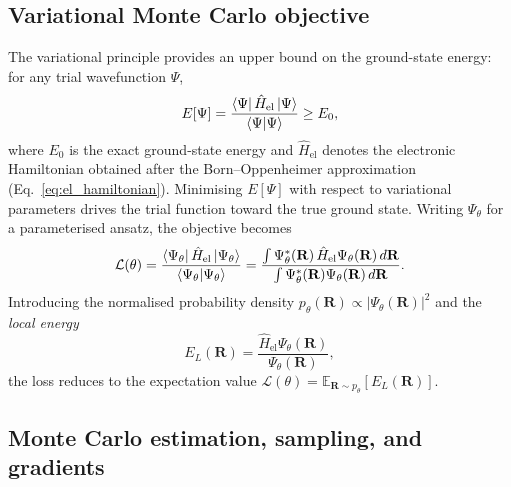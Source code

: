\subsection{Variational Monte Carlo objective}

The variational principle provides an upper bound on the ground-state energy: for any trial wavefunction $\Psi$,
\begin{equation}
	E[\Psi] = \frac{\left\langle{\Psi}\right| \hat{H}_{\text{el}}\left|{\Psi}\right\rangle}{\left\langle{\Psi}\middle|{\Psi}\right\rangle} \ge E_0,
\end{equation}
where $E_0$ is the exact ground-state energy and $\hat{H}_{\text{el}}$ denotes the electronic Hamiltonian obtained after the Born--Oppenheimer approximation (Eq.~\ref{eq:el_hamiltonian}). Minimising $E[\Psi]$ with respect to variational parameters drives the trial function toward the true ground state. Writing $\Psi_\theta$ for a parameterised ansatz, the objective becomes
\begin{equation}
	\mathcal{L}(\theta)
	=\frac{\left\langle{\Psi_{\theta}}\right| \hat{H}_{\text{el}}\left|{\Psi_{\theta}}\right\rangle}{\left\langle{\Psi_{\theta}}\middle|{\Psi_{\theta}}\right\rangle}
	=\frac{\int \Psi_\theta^*(\mathbf{R})\,\hat{H}_{\text{el}}\Psi_\theta(\mathbf{R})\,d\mathbf{R}}{\int \Psi_\theta^*(\mathbf{R})\Psi_\theta(\mathbf{R})\,d\mathbf{R}}.
\end{equation}
Introducing the normalised probability density $p_\theta(\mathbf{R})\propto|\Psi_\theta(\mathbf{R})|^2$ and the \emph{local energy}
\begin{equation}
	E_L(\mathbf{R})=\frac{\hat{H}_{\text{el}}\Psi_\theta(\mathbf{R})}{\Psi_\theta(\mathbf{R})},
\end{equation}
the loss reduces to the expectation value $\mathcal{L}(\theta)=\mathbb{E}_{\mathbf{R}\sim p_\theta}[E_L(\mathbf{R})]$.

\subsection{Monte Carlo estimation, sampling, and gradients}

